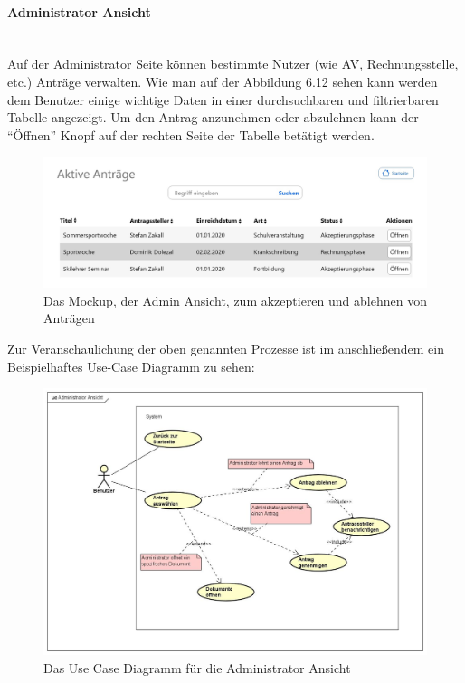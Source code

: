 \paragraph{Administrator Ansicht}
~\\
Auf der Administrator Seite können bestimmte Nutzer (wie AV, Rechnungsstelle, etc.) Anträge verwalten. Wie man auf der Abbildung 6.12 sehen kann werden dem Benutzer einige wichtige Daten in einer durchsuchbaren und filtrierbaren Tabelle angezeigt. Um den Antrag anzunehmen oder abzulehnen kann der \enquote{Öffnen} Knopf auf der rechten Seite der Tabelle betätigt werden.
\begin{figure}[H]
	\centering
	\includegraphics[width=1\linewidth]{images/Mockup-Admin}
	\caption[Mockup Adminansicht]{Das Mockup, der Admin Ansicht, zum akzeptieren und ablehnen von Anträgen}
	\label{fig:mockupAdmin}
\end{figure}
Zur Veranschaulichung der oben genannten Prozesse ist im anschließendem ein Beispielhaftes Use-Case Diagramm zu sehen: 
\begin{figure}[H]
	\centering
	\includegraphics[width=1\linewidth]{images/uc-admin}
	\caption[Use Case Diagramm Adminansicht]{Das Use Case Diagramm für die Administrator Ansicht}
	\label{fig:ucAdmin}
\end{figure}
